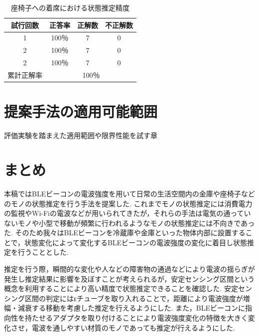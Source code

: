 \documentclass[Japanese]{dicomopapers}
\begin{document}
\begin{table}[htb]
    \begin{center}
        \caption{座椅子への着席における状態推定精度}
        \label{chair_fig}
        \begin{tabular}{|c|c|c|c|} \hline
        試行回数 & 正答率 & 正解数 & 不正解数 \\ \hline
        1 & 100％ & 7 & 0 \\ \hline
        2 & 100％ & 7 & 0 \\ \hline
        2 & 100％ & 7 & 0 \\ \hline \hline
        累計正解率 & \multicolumn{3}{c|}{100％} \\ \hline
        \end{tabular}
    \end{center}
\end{table}






\section{提案手法の適用可能範囲}
評価実験を踏まえた適用範囲や限界性能を試す章




\section{まとめ}
本稿ではBLEビーコンの電波強度を用いて日常の生活空間内の金庫や座椅子などのモノの状態推定を行う手法を提案した.
これまでモノの状態推定には消費電力の監視やWi-Fiの電波などが用いられてきたが，それらの手法は電気の通っていないモノや小型で移動が頻繁に行われるようなモノの状態推定には不向きであった.
そのため我々はBLEビーコンを冷蔵庫や金庫といった物体内部に設置することで，状態変化によって変化するBLEビーコンの電波強度の変化に着目し状態推定を行うこととした.

推定を行う際，瞬間的な変化や人などの障害物の通過などにより電波の揺らぎが発生し推定結果に影響を及ぼすことが考えられるが，安定センシング区間という概念を利用することにより高い精度で状態推定できることを確認した.
安定センシング区間の判定にはεチューブを取り入れることで，距離により電波強度が増幅・減衰する移動を考慮した推定を行えるようにした.
また，BLEビーコンに指向性を持たせるアダプタを取り付けることにより電波強度変化の特徴を大きく変化させ，電波を通しやすい材質のモノであっても推定が行えるようにした.
\end{document}
